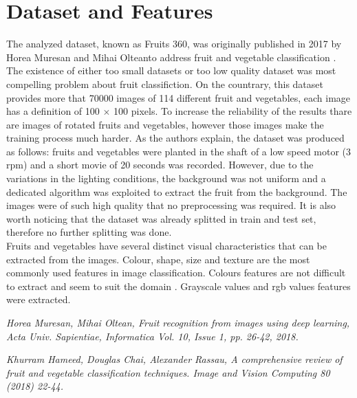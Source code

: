 \documentclass{article}
\begin{document}
\section{Dataset and Features}
The analyzed dataset, known as Fruits 360, was originally published in 2017  by Horea Muresan and Mihai Olteanto address fruit and vegetable classification \cite{dataset}. The existence of either too small datasets or too low quality dataset was most compelling problem about fruit classifiction.  On the countrary, this dataset provides more that 70000 images of 114 different fruit and vegetables, each image has a definition of 100 $\times$ 100 pixels. To increase the reliability of the results thare are images of rotated fruits and vegetables, however those images make the training process much harder.
As the authors explain, the dataset was produced as follows: fruits and vegetables were planted in the shaft of a low speed motor (3 rpm) and a short movie of 20 seconds was recorded. However, due to the variations in the lighting conditions, the background was not uniform and a dedicated algorithm was exploited to extract the fruit from the background. The images were of such high quality that no preprocessing was required.
It is also worth noticing that the dataset was already splitted in train and test set, therefore no further splitting was done.\\
Fruits and vegetables have several distinct visual characteristics that can be extracted from the images. Colour, shape, size and texture are the most commonly used features in image classification. Colours features are not difficult to extract and seem to suit the domain \cite{review}. Grayscale values and rgb values features were extracted. 


\begin{thebibliography}{9}

\textit{Horea Muresan, Mihai Oltean, Fruit recognition from images using deep learning, Acta Univ. Sapientiae, Informatica Vol. 10, Issue 1, pp. 26-42, 2018.}

\textit{Khurram Hameed, Douglas Chai, Alexander Rassau, A comprehensive review of fruit and vegetable classification techniques. Image and Vision Computing 80 (2018) 22-44.}
\end{thebibliography}
 
\end{document}
